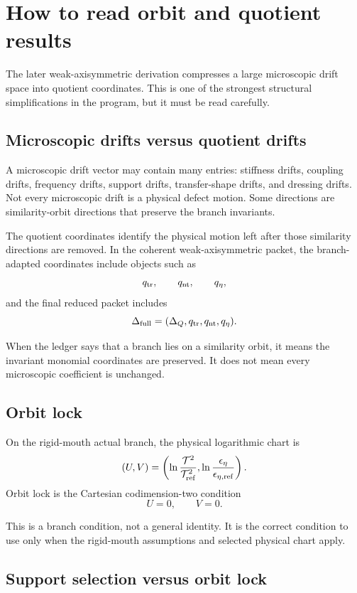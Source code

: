 \section{How to read orbit and quotient results}
\label{sec:how-to-read-orbit-quotient}

The later weak-axisymmetric derivation compresses a large microscopic drift space into quotient coordinates.  This is one of the strongest structural simplifications in the program, but it must be read carefully.

\subsection{Microscopic drifts versus quotient drifts}
\label{subsec:microscopic-vs-quotient-drifts}

A microscopic drift vector may contain many entries: stiffness drifts, coupling drifts, frequency drifts, support drifts, transfer-shape drifts, and dressing drifts.  Not every microscopic drift is a physical defect motion.  Some directions are similarity-orbit directions that preserve the branch invariants.

The quotient coordinates identify the physical motion left after those similarity directions are removed.  In the coherent weak-axisymmetric packet, the branch-adapted coordinates include objects such as
\[
q_{\rm tr},
\qquad
q_{\rm nt},
\qquad
q_\eta,
\]
and the final reduced packet includes
\[
\Delta_{\rm full}
=
(\Delta_Q,q_{\rm tr},q_{\rm nt},q_\eta).
\]

When the ledger says that a branch lies on a similarity orbit, it means the invariant monomial coordinates are preserved.  It does not mean every microscopic coefficient is unchanged.

\subsection{Orbit lock}
\label{subsec:orbit-lock}

On the rigid-mouth actual branch, the physical logarithmic chart is
\[
(U,V)=
\left(
\ln\frac{\mathcal T^2}{\mathcal T_{\rm ref}^2},
\ln\frac{\epsilon_\eta}{\epsilon_{\eta,\rm ref}}
\right).
\]
Orbit lock is the Cartesian codimension-two condition
\[
U=0,
\qquad
V=0.
\]

This is a branch condition, not a general identity.  It is the correct condition to use only when the rigid-mouth assumptions and selected physical chart apply.

\subsection{Support selection versus orbit lock}
\label{subsec:support-selection-vs-orbit-lock}

